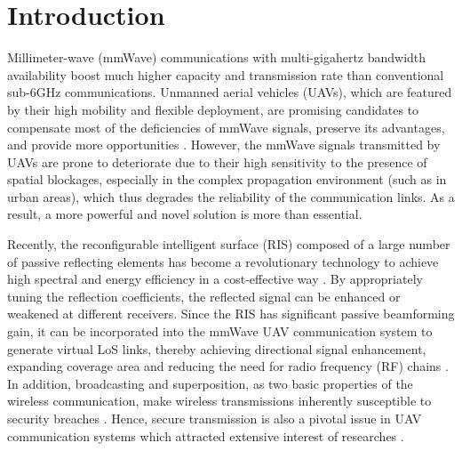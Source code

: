 \documentclass[journal]{IEEEtran}
\begin{document}
\section{Introduction}
Millimeter-wave (mmWave) communications with multi-gigahertz bandwidth availability boost much higher capacity and transmission rate than conventional sub-6GHz communications. Unmanned aerial vehicles (UAVs), which are featured by their high mobility and flexible deployment, are promising candidates to compensate most of the deficiencies of mmWave signals, preserve its advantages, and provide more opportunities \cite{UAVMMWAVE-2}. However, the mmWave signals transmitted by UAVs are prone to deteriorate due to their high sensitivity to the presence of spatial blockages, especially in the complex propagation environment (such as in urban areas), which thus degrades the reliability of the communication links. As a result, a more powerful and novel solution is more than essential.

Recently, the reconfigurable intelligent surface (RIS) composed of a large number of passive reflecting elements has become a revolutionary technology to achieve high spectral and energy efficiency in a cost-effective way \cite{RIS-101}. By appropriately tuning the reflection coefficients, the reflected signal can be enhanced or weakened at different receivers. Since the RIS has significant passive beamforming gain, it can be incorporated into the mmWave UAV communication system to generate virtual LoS links, thereby achieving directional signal enhancement, expanding coverage area and reducing the need for radio frequency (RF) chains \cite{RISUAV-7}. In addition, broadcasting and superposition, as two basic properties of the wireless communication, make wireless transmissions inherently susceptible to security breaches \cite{RIS-20}. Hence, secure transmission is also a pivotal issue in UAV communication systems which attracted extensive interest of researches \cite{RISUAV-1,RISUAV-9}.
\end{document}
